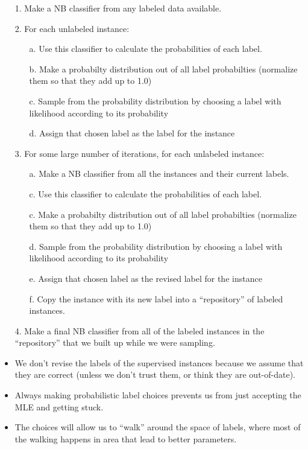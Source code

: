 \documentclass[11pt,letterpaper]{article}
\begin{document}
\begin{itemize}
  \item[1.] Make a NB classifier from any labeled data available.
  \item[2.] For each unlabeled instance:
    \begin{itemize}
      \item[a.] Use this classifier to calculate the probabilities of each label.
      \item[b.] Make a probabilty distribution out of all label probabilties (normalize them so that they add up to 1.0)
      \item[c.] Sample from the probability distribution by choosing a label with likelihood according to its probability
      \item[d.] Assign that chosen label as the label for the instance
    \end{itemize}
  \item[3.] For some large number of iterations, for each unlabeled instance:
    \begin{itemize}
      \item[a.] Make a NB classifier from all the instances and their current labels.
      \item[c.] Use this classifier to calculate the probabilities of each label.
      \item[c.] Make a probabilty distribution out of all label probabilties (normalize them so that they add up to 1.0)
      \item[d.] Sample from the probability distribution by choosing a label with likelihood according to its probability
      \item[e.] Assign that chosen label as the revised label for the instance
      \item[f.] Copy the instance with its new label into a ``repository'' of labeled instances.
    \end{itemize}
  \item[4.] Make a final NB classifier from all of the labeled instances in the ``repository'' that we built up while we were sampling.
  \item We don't revise the labels of the supervised instances because we assume that they are correct (unless we don't trust them, or think they are out-of-date).
  \item Always making probabilistic label choices prevents us from just accepting the MLE and getting stuck.
  \item The choices will allow us to ``walk'' around the space of labels, where most of the walking happens in area that lead to better parameters.
\end{itemize}
\end{document}
